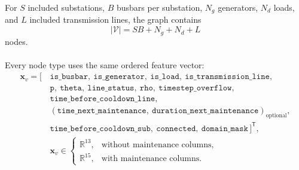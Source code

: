 For $S$ included substations, $B$ busbars per substation, $N_g$ generators,
$N_d$ loads, and $L$ included transmission lines, the graph contains
\begin{equation}
  |\mathcal{V}| = SB + N_g + N_d + L
  \label{eq:heterogeneous-line-node-count}
\end{equation}
nodes.
\\
\\
Every node type uses the same ordered feature vector:
\begin{equation}
  \begin{split}
  \mathbf{x}_v = [\,&
  \texttt{is\_busbar},\
  \texttt{is\_generator},\
  \texttt{is\_load},\
  \texttt{is\_transmission\_line},\\
  &\texttt{p},\
  \texttt{theta},\
  \texttt{line\_status},\
  \texttt{rho},\
  \texttt{timestep\_overflow},\\
  &\texttt{time\_before\_cooldown\_line},\\
  &(\texttt{time\_next\_maintenance},\
  \texttt{duration\_next\_maintenance})_{\mathrm{optional}},\\
  &\texttt{time\_before\_cooldown\_sub},\
  \texttt{connected},\
  \texttt{domain\_mask}
  \,]^{\mathsf T},\\
  &\mathbf{x}_v \in
  \begin{cases}
    \mathbb{R}^{13}, & \text{without maintenance columns},\\
    \mathbb{R}^{15}, & \text{with maintenance columns}.
  \end{cases}
  \end{split}
  \label{eq:heterogeneous-line-common-node-vector}
\end{equation}
